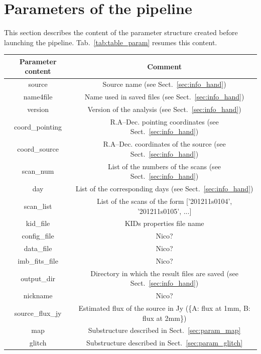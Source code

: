 \documentclass[a4paper]{article}
\begin{document}
\section{Parameters of the pipeline}
\label{sec:param}
This section describes the content of the parameter structure created before launching the pipeline. Tab.~\ref{tab:table_param} resumes this content.
\begin{table}[!h]
	\begin{center}
	\begin{tabular}{cc}
	 \hline
         \hline
	Parameter content & Comment\\
	\hline
	   source & Source name (see Sect.~\ref{sec:info_hand}) \\
           name4file & Name used in saved files (see Sect.~\ref{sec:info_hand}) \\
           version & Version of the analysis (see Sect.~\ref{sec:info_hand}) \\
           coord\_pointing & 	R.A--Dec. pointing coordinates (see Sect.~\ref{sec:info_hand}) \\
           coord\_source & R.A--Dec. coordinates of the source (see Sect.~\ref{sec:info_hand}) \\
           scan\_num & List of the numbers of the scans (see Sect.~\ref{sec:info_hand}) \\
           day & List of the corresponding days (see Sect.~\ref{sec:info_hand}) \\
           scan\_list & List of the scans of the form ['201211s0104', '201211s0105', ...] \\
           kid\_file & KIDs properties file name \\
           config\_file & {\color{red} Nico?}\\
           data\_file & {\color{red} Nico?} \\
           imb\_fits\_file & {\color{red} Nico?} \\
           output\_dir & Directory in which the result files are saved (see Sect.~\ref{sec:info_hand}) \\
           nickname & {\color{red} Nico?} \\
           source\_flux\_jy & Estimated flux of the source in Jy (\{A: flux at 1mm, B: flux at 2mm\}) \\
           map & Substructure described in Sect.~\ref{sec:param_map} \\
           glitch & Substructure described in Sect.~\ref{sec:param_glitch} \\

\end{tabular}
\end{center}
\end{table}
\end{document}
